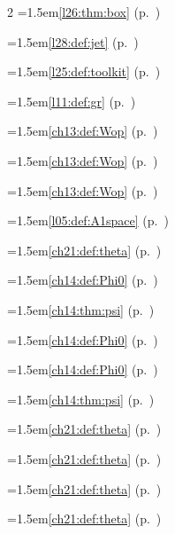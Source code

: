 \begin{multicols}{2}
\hangindent=1.5em\quad \ref{l26:thm:box} (p.~\pageref{l26:thm:box})\par
\hangindent=1.5em\quad \ref{l28:def:jet} (p.~\pageref{l28:def:jet})\par
\hangindent=1.5em\quad \ref{l25:def:toolkit} (p.~\pageref{l25:def:toolkit})\par
\hangindent=1.5em\quad \ref{l11:def:gr} (p.~\pageref{l11:def:gr})\par
\hangindent=1.5em\quad \ref{ch13:def:Wop} (p.~\pageref{ch13:def:Wop})\par
\hangindent=1.5em\quad \ref{ch13:def:Wop} (p.~\pageref{ch13:def:Wop})\par
\hangindent=1.5em\quad \ref{ch13:def:Wop} (p.~\pageref{ch13:def:Wop})\par
\par{}\par\nopagebreak\smallskip
\hangindent=1.5em\quad \ref{l05:def:A1space} (p.~\pageref{l05:def:A1space})\par
\par{}\par\nopagebreak\smallskip
\hangindent=1.5em\quad \ref{ch21:def:theta} (p.~\pageref{ch21:def:theta})\par
\hangindent=1.5em\quad \ref{ch14:def:Phi0} (p.~\pageref{ch14:def:Phi0})\par
\hangindent=1.5em\quad \ref{ch14:thm:psi} (p.~\pageref{ch14:thm:psi})\par
\hangindent=1.5em\quad \ref{ch14:def:Phi0} (p.~\pageref{ch14:def:Phi0})\par
\hangindent=1.5em\quad \ref{ch14:def:Phi0} (p.~\pageref{ch14:def:Phi0})\par
\hangindent=1.5em\quad \ref{ch14:thm:psi} (p.~\pageref{ch14:thm:psi})\par
\hangindent=1.5em\quad \ref{ch21:def:theta} (p.~\pageref{ch21:def:theta})\par
\hangindent=1.5em\quad \ref{ch21:def:theta} (p.~\pageref{ch21:def:theta})\par
\hangindent=1.5em\quad \ref{ch21:def:theta} (p.~\pageref{ch21:def:theta})\par
\hangindent=1.5em\quad \ref{ch21:def:theta} (p.~\pageref{ch21:def:theta})\par
\par{}\par\nopagebreak\smallskip

\end{multicols}
